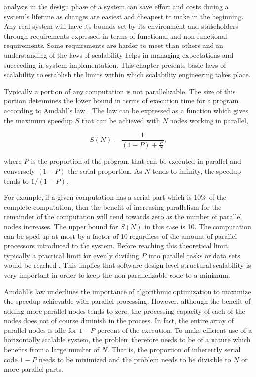 \documentclass[english]{tktltiki2}
\theoremstyle{definition}
\theoremstyle{remark}
\begin{document}
analysis in the design phase of a system can save effort and costs during a
system’s lifetime as changes are easiest and cheapest to make in the beginning.
Any real system will have its bounds set by its environment and stakeholders
through requirements expressed in terms of functional and non-functional
requirements. Some requirements are harder to meet than others and an
understanding of the laws of scalability helps in managing expectations and
succeeding in system implementation. This chapter presents basic laws of
scalability to establish the limits within which scalability engineering takes
place.

Typically a portion of any computation is not parallelizable. The size of this
portion determines the lower bound in terms of execution time for a program
according to Amdahl’s law~\cite{amdahlslaw}. The law can be expressed as a
function which gives the maximum speedup $S$ that can be achieved with $N$ nodes
working in parallel,

\[
S(N) = \frac{1}{(1-P)+\frac{P}{N}},
\]

where $P$ is the proportion of the program that can be executed in parallel and
conversely $(1-P)$ the serial proportion. As $N$ tends to infinity, the speedup
tends to $1/(1-P)$. 

For example, if a given computation has a serial part which is 10\% of the
complete computation, then the benefit of increasing parallelism for the
remainder of the computation will tend towards zero as the number of parallel
nodes increases. The upper bound for $S(N)$ in this case is 10. The computation
can be sped up at most by a factor of 10 regardless of the amount of parallel
processors introduced to the system. Before reaching this theoretical limit,
typically a practical limit for evenly dividing $P$ into parallel tasks or data
sets would be reached .
This implies that software design level structural scalability is very important
in order to keep the non-parallelizable code to a minimum.

Amdahl’s law underlines the importance of algorithmic optimization to maximize
the speedup achievable with parallel processing. However, although the benefit
of adding more parallel nodes tends to zero, the processing capacity of each of
the nodes does not of course diminish in the process. In fact, the entire array
of parallel nodes is idle for $1-P$ percent of the execution. To make efficient
use of a horizontally scalable system, the problem therefore needs to be of a
nature which benefits from a large number of $N$. That is, the proportion of
inherently serial code $1-P$ needs to be minimized and the problem needs to be
divisible to $N$ or more parallel parts.
\end{document}
